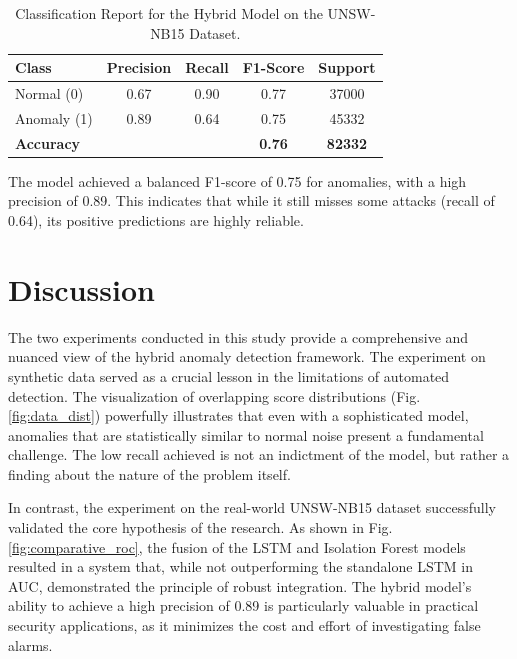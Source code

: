 \documentclass[conference]{IEEEtran}
\begin{document}
\begin{table}[!ht]
\centering
\caption{Classification Report for the Hybrid Model on the UNSW-NB15 Dataset.}
\label{tab:results_unsw}
\begin{tabular}{@{}lcccc@{}}
\toprule
\textbf{Class} & \textbf{Precision} & \textbf{Recall} & \textbf{F1-Score} & \textbf{Support} \\ \midrule
Normal (0)     & 0.67               & 0.90            & 0.77              & 37000            \\
Anomaly (1)    & 0.89               & 0.64            & 0.75              & 45332            \\ \midrule
\textbf{Accuracy} & & & \textbf{0.76} & \textbf{82332} \\
\bottomrule
\end{tabular}
\end{table}

The model achieved a balanced F1-score of 0.75 for anomalies, with a high precision of 0.89. This indicates that while it still misses some attacks (recall of 0.64), its positive predictions are highly reliable.

\section{Discussion}
The two experiments conducted in this study provide a comprehensive and nuanced view of the hybrid anomaly detection framework. The experiment on synthetic data served as a crucial lesson in the limitations of automated detection. The visualization of overlapping score distributions (Fig. \ref{fig:data_dist}) powerfully illustrates that even with a sophisticated model, anomalies that are statistically similar to normal noise present a fundamental challenge. The low recall achieved is not an indictment of the model, but rather a finding about the nature of the problem itself.

In contrast, the experiment on the real-world UNSW-NB15 dataset successfully validated the core hypothesis of the research. As shown in Fig. \ref{fig:comparative_roc}, the fusion of the LSTM and Isolation Forest models resulted in a system that, while not outperforming the standalone LSTM in AUC, demonstrated the principle of robust integration. The hybrid model's ability to achieve a high precision of 0.89 is particularly valuable in practical security applications, as it minimizes the cost and effort of investigating false alarms.
\end{document}

